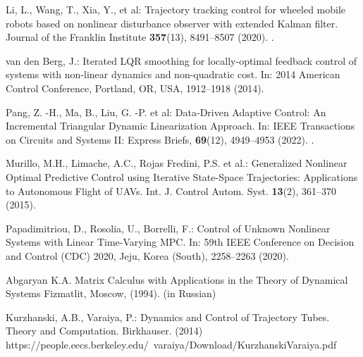 \documentclass[../main.tex]{subfiles}
\begin{document}
\begin{thebibliography}{99}
Li, L., Wang, T., Xia, Y., et al:  Trajectory tracking control for wheeled mobile robots based on nonlinear disturbance observer with extended Kalman filter. Journal of the Franklin Institute \textbf{357}(13), 8491--8507 (2020). .

van den Berg, J.: Iterated LQR smoothing for locally-optimal feedback control of systems with non-linear dynamics and non-quadratic cost. In: 2014 American Control Conference, Portland, OR, USA, 1912--1918 (2014). 

Pang, Z. -H., Ma, B., Liu, G. -P.  et al: Data-Driven Adaptive Control: An Incremental Triangular Dynamic Linearization Approach. In: IEEE Transactions on Circuits and Systems II: Express Briefs, \textbf{69}(12), 4949--4953 (2022). .


Murillo, M.H., Limache, A.C., Rojas Fredini, P.S. et al.: Generalized Nonlinear Optimal Predictive Control using Iterative State-Space
Trajectories: Applications to Autonomous Flight of UAVs. Int. J. Control Autom. Syst. \textbf{13}(2), 361--370 (2015).

Papadimitriou, D., Rosolia, U., Borrelli, F.: Control of Unknown Nonlinear Systems with Linear Time-Varying MPC. In: 59th IEEE Conference on Decision and Control (CDC) 2020, Jeju, Korea (South), 2258--2263 (2020). 


Abgaryan K.A. Matrix Calculus with Applications in the Theory of Dynamical Systems Fizmatlit, Moscow, (1994). (in Russian)

Kurzhanski, A.B., Varaiya, P.: Dynamics and Control of Trajectory Tubes. Theory and Computation. Birkhauser. (2014)\\ https://people.eecs.berkeley.edu/~varaiya/Download/KurzhanskiVaraiya.pdf


\end{thebibliography}
\end{document}
